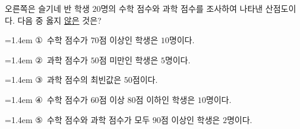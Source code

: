 \noindent\begin{minipage}[t]{0.58\linewidth}\vspace{0pt}\raggedright 오른쪽은 슬기네 반 학생 $20$명의 수학 점수와 과학 점수를 조사하여 나타낸 산점도이다. 다음 중 옳지 \underline{않은} 것은?\end{minipage}\hfill\begin{minipage}[t]{0.4\linewidth}\vspace{0pt}\centering \resizebox{\ifdim\width>\linewidth\linewidth\else\width\fi}{!}{}\end{minipage}\par
\par\medskip\par\noindent\hangindent=1.4em {\small ①}\ 수학 점수가 $70$점 이상인 학생은 $10$명이다.\par\noindent\hangindent=1.4em {\small ②}\ 과학 점수가 $50$점 미만인 학생은 $5$명이다.\par\noindent\hangindent=1.4em {\small ③}\ 과학 점수의 최빈값은 $50$점이다.\par\noindent\hangindent=1.4em {\small ④}\ 수학 점수가 $60$점 이상 $80$점 이하인 학생은 $10$명이다.\par\noindent\hangindent=1.4em {\small ⑤}\ 수학 점수와 과학 점수가 모두 $90$점 이상인 학생은 $2$명이다.\par\medskip
